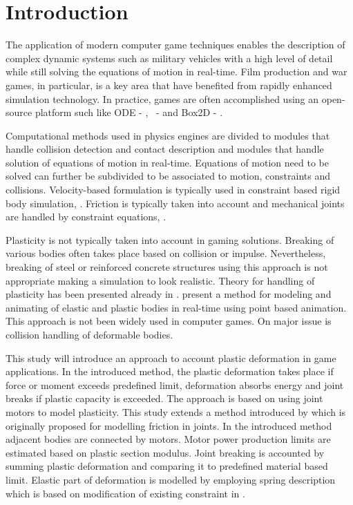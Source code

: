 \section{Introduction}

The application of modern computer game techniques enables the description of complex dynamic systems 
such as military vehicles with a high level of detail while still solving the equations of motion in real-time.
Film production and war games, in particular, is a key area that have benefited from rapidly enhanced simulation technology. 
In practice, games are often accomplished using an open-source platform such 
like ODE - \cite{ode}, \bullet\ - \cite{bullet} and Box2D - \cite{box2d}.

Computational methods used in physics engines are divided to modules that handle collision detection and 
contact description and modules that handle solution of equations of motion in real-time. Equations of motion need to be 
solved can further be subdivided to be associated to motion, constraints and collisions. 
Velocity-based formulation is typically used in constraint based rigid body simulation, \cite{erleben.thesis}. 
Friction is typically taken into account and mechanical joints are handled by constraint equations,
\cite{erleben.thesis}.

Plasticity is not typically taken into account in gaming solutions. 
Breaking of various bodies often takes place based on collision or impulse.
Nevertheless, breaking of steel or reinforced concrete structures using this approach 
is not appropriate making a simulation to look realistic. Theory for handling of plasticity 
has been presented already in \cite{cg1988}. \cite{muller2005meshless} 
present a method for modeling and animating of elastic and plastic bodies in real-time using 
point based animation. This approach is not been widely used in computer games.  
On major issue is collision handling of deformable bodies.

This study will introduce an approach to account plastic deformation in game applications.   
In the introduced method, the plastic deformation takes place if force or moment exceeds predefined 
limit, deformation absorbs energy and joint breaks if plastic capacity is exceeded. 
The approach is based on using joint motors to model plasticity. 
This study extends a method introduced by
\citet{erleben.thesis} 
which is originally proposed for modelling friction in joints. 
In the introduced method adjacent bodies are connected by motors. 
Motor power production limits are estimated based on plastic section modulus. 
Joint breaking is accounted by summing plastic deformation and comparing it to 
predefined material based limit. Elastic part of deformation is modelled by employing 
spring description which is based on modification of existing constraint in \bullet.

